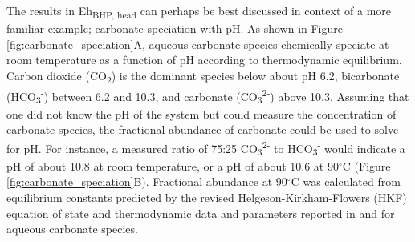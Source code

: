 The results in Eh\textsubscript{BHP, head} can perhaps be best discussed in context of a more familiar example; carbonate speciation with pH. As shown in Figure \ref{fig:carbonate_speciation}A, aqueous carbonate species chemically speciate at room temperature as a function of pH according to thermodynamic equilibrium. Carbon dioxide (CO\textsubscript{2}) is the dominant species below about pH 6.2, bicarbonate (HCO\textsubscript{3}\textsuperscript{-}) between 6.2 and 10.3, and carbonate (CO\textsubscript{3}\textsuperscript{2-}) above 10.3. Assuming that one did not know the pH of the system but could measure the concentration of carbonate species, the fractional abundance of carbonate could be used to solve for pH. For instance, a measured ratio of 75:25 CO\textsubscript{3}\textsuperscript{2-} to HCO\textsubscript{3}\textsuperscript{-} would indicate a pH of about 10.8 at room temperature, or a pH of about 10.6 at 90$^{\circ}$C (Figure \ref{fig:carbonate_speciation}B). Fractional abundance at 90$^{\circ}$C was calculated from equilibrium constants predicted by the revised Helgeson-Kirkham-Flowers (HKF) equation of state \citep{shock1992calculation} and thermodynamic data and parameters reported in \cite{shock1988calculation} and \cite{plyasunov2001correlation} for aqueous carbonate species.

